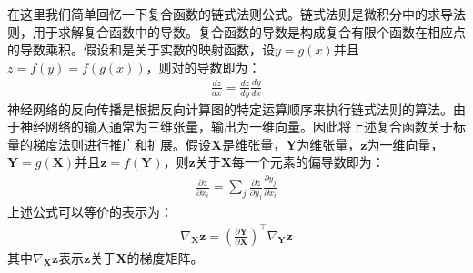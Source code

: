 \documentclass[letterpaper,10pt,english]{sphinxmanual}
\begin{document}
\sphinxAtStartPar
在这里我们简单回忆一下复合函数的链式法则公式。链式法则是微积分中的求导法则，用于求解复合函数中的导数。复合函数的导数是构成复合有限个函数在相应点的导数乘积。假设和是关于实数的映射函数，设\(y=g(x)\)并且\(z=f(y)=f(g(x))\)，则对的导数即为：
\begin{equation}\label{equation:chapter_computational_graph/components_of_computational_graph:chapter_computational_graph/components_of_computational_graph:0}
\begin{split}\frac{dz}{dx}=\frac{dz}{dy}\frac{dy}{dx}\end{split}
\end{equation}
\sphinxAtStartPar
神经网络的反向传播是根据反向计算图的特定运算顺序来执行链式法则的算法。由于神经网络的输入通常为三维张量，输出为一维向量。因此将上述复合函数关于标量的梯度法则进行推广和扩展。假设\(\boldsymbol{X}\)是维张量，\(\boldsymbol{Y}\)为维张量，\(\boldsymbol{z}\)为一维向量，\(\boldsymbol{Y}=g(\boldsymbol{X})\)并且\(\boldsymbol{z}=f(\boldsymbol{Y})\)，则\(\boldsymbol{z}\)关于\(\boldsymbol{X}\)每一个元素的偏导数即为：
\begin{equation}\label{equation:chapter_computational_graph/components_of_computational_graph:chapter_computational_graph/components_of_computational_graph:1}
\begin{split}\frac{\partial z}{\partial x_i}=\sum_j\frac{\partial z}{\partial y_j}\frac{\partial y_j}{\partial x_i}\end{split}
\end{equation}
\sphinxAtStartPar
上述公式可以等价的表示为：
\begin{equation}\label{equation:chapter_computational_graph/components_of_computational_graph:chapter_computational_graph/components_of_computational_graph:2}
\begin{split}\nabla_{\boldsymbol{X}}\boldsymbol{z} = (\frac{\partial \boldsymbol{Y}}{\partial \boldsymbol{X}})^{\top}\nabla_{\boldsymbol{Y}}\boldsymbol{z}\end{split}
\end{equation}
\sphinxAtStartPar
其中\(\nabla_{\boldsymbol{X}}\boldsymbol{z}\)表示\(\boldsymbol{z}\)关于\(\boldsymbol{X}\)的梯度矩阵。
\end{document}
